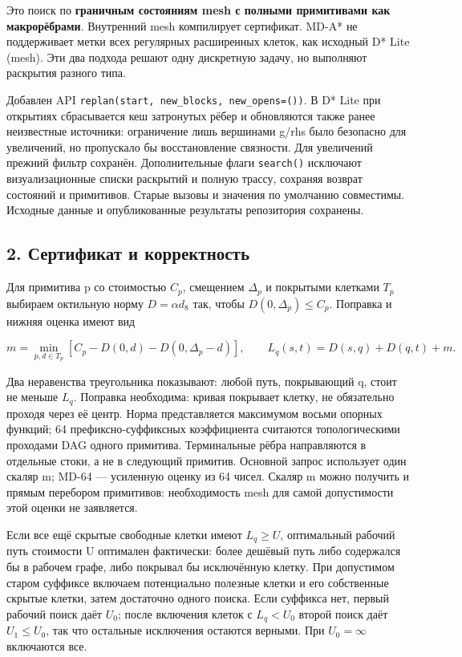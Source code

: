 \documentclass[
  10pt,
]{article}
\begin{document}
Это поиск по \textbf{граничным состояниям mesh с полными примитивами как
макрорёбрами}. Внутренний mesh компилирует сертификат. MD-A* не
поддерживает метки всех регулярных расширенных клеток, как исходный D*
Lite (mesh). Эти два подхода решают одну дискретную задачу, но выполняют
раскрытия разного типа.

Добавлен API \texttt{replan(start,\ new\_blocks,\ new\_opens=())}. В D*
Lite при открытиях сбрасывается кеш затронутых рёбер и обновляются также
ранее неизвестные источники: ограничение лишь вершинами g/rhs было
безопасно для увеличений, но пропускало бы восстановление связности. Для
увеличений прежний фильтр сохранён. Дополнительные флаги
\texttt{search()} исключают визуализационные списки раскрытий и полную
трассу, сохраняя возврат состояний и примитивов. Старые вызовы и
значения по умолчанию совместимы. Исходные данные и опубликованные
результаты репозитория сохранены.

\subsection{2. Сертификат и
корректность}\label{ux441ux435ux440ux442ux438ux444ux438ux43aux430ux442-ux438-ux43aux43eux440ux440ux435ux43aux442ux43dux43eux441ux442ux44c}

Для примитива p со стоимостью \(C_p\), смещением \(\Delta_p\) и
покрытыми клетками \(T_p\) выбираем октильную норму \(D=\alpha d_8\)
так, чтобы \(D(0,\Delta_p)\le C_p\). Поправка и нижняя оценка имеют вид

\[m=\min_{p,d\in T_p}[C_p-D(0,d)-D(0,\Delta_p-d)],\qquad L_q(s,t)=D(s,q)+D(q,t)+m.\]

Два неравенства треугольника показывают: любой путь, покрывающий q,
стоит не меньше \(L_q\). Поправка необходима: кривая покрывает клетку,
не обязательно проходя через её центр. Норма представляется максимумом
восьми опорных функций; 64 префиксно-суффиксных коэффициента считаются
топологическими проходами DAG одного примитива. Терминальные рёбра
направляются в отдельные стоки, а не в следующий примитив. Основной
запрос использует один скаляр m; MD-64 --- усиленную оценку из 64 чисел.
Скаляр m можно получить и прямым перебором примитивов: необходимость
mesh для самой допустимости этой оценки не заявляется.

Если все ещё скрытые свободные клетки имеют \(L_q\ge U\), оптимальный
рабочий путь стоимости U оптимален фактически: более дешёвый путь либо
содержался бы в рабочем графе, либо покрывал бы исключённую клетку. При
допустимом старом суффиксе включаем потенциально полезные клетки и его
собственные скрытые клетки, затем достаточно одного поиска. Если
суффикса нет, первый рабочий поиск даёт \(U_0\); после включения клеток
с \(L_q<U_0\) второй поиск даёт \(U_1\le U_0\), так что остальные
исключения остаются верными. При \(U_0=\infty\) включаются все.
\end{document}
